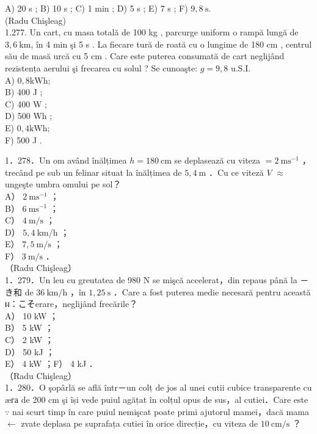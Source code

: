 \documentclass[10pt]{article}
\begin{document}
A) 20 s ; B) 10 s ; C) 1 min ; D) 5 s ; E) 7 s ; F) $9,8 \mathrm{~s}$.\\
(Radu Chişleag)\\
1.277. Un cart, cu masa totală de 100 kg , parcurge uniform o rampă lungă de $3,6 \mathrm{~km}$, în 4 min şi 5 s . La fiecare tură de roată cu o lungime de 180 cm , centrul său de masă urcă cu 5 cm . Care este puterea consumată de cart neglijând rezistența aerului şi frecarea cu solul ? Se cunoaşte: $g=9,8$ u.S.I.\\
A) $0,8 \mathrm{kWh}$;\\
B) 400 J ;\\
C) 400 W ;\\
D) 500 Wh ;\\
E) $0,4 \mathrm{kWh}$;\\
F) 500 J .

1．278．Un om având înălțimea $h=180 \mathrm{~cm}$ se deplasează cu viteza $=2 \mathrm{~ms}^{-1}$ ，trecând pe sub un felinar situat la înălțimea de $5,4 \mathrm{~m}$ ．Cu ce viteză $V$ $\approx$ ungeşte umbra omului pe sol？\\
A） $2 \mathrm{~ms}^{-1}$ ；\\
B） $6 \mathrm{~ms}^{-1}$ ；\\
C） $4 \mathrm{~m} / \mathrm{s}$ ；\\
D） $5,4 \mathrm{~km} / \mathrm{h}$ ；\\
E） $7,5 \mathrm{~m} / \mathrm{s}$ ；\\
F） $3 \mathrm{~m} / \mathrm{s}$ ．\\
（Radu Chişleag）\\
1．279．Un leu cu greutatea de 980 N se mişcă accelerat，din repaus până la －き和 de $36 \mathrm{~km} / \mathrm{h}$ ，în $1,25 \mathrm{~s}$ ．Care a fost puterea medie necesară pentru această ผ：こそerare，neglijând frecările？\\
A） 10 kW ；\\
B） 5 kW ；\\
C） 2 kW ；\\
D） 50 kJ ；\\
E） 4 kW ；F） 4 kJ ．\\
（Radu Chişleag）\\
1．280．O şopârlă se află într－un colț de jos al unei cutii cubice transparente cu æга de 200 cm şi își vede puiul agățat în colțul opus de sus，al cutiei．Care este $\because$ nai scurt timp în care puiul nemişcat poate primi ajutorul mamei，dacă mama $\leftarrow$ zvate deplasa pe suprafața cutiei în orice direcție，cu viteza de $10 \mathrm{~cm} / \mathrm{s}$ ？
\end{document}
